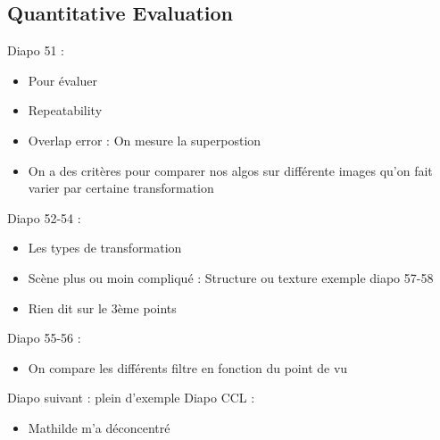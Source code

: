 \documentclass{article}
\theoremstyle{plain}%
\theoremstyle{definition}
\theoremstyle{remark}
\begin{document}
\subsection{Quantitative Evaluation}
Diapo 51 : 
\begin{itemize}
    \item Pour évaluer 
    \item Repeatability 
    \item Overlap error : On mesure la superpostion 
    \item On a des critères pour comparer nos algos sur différente images qu'on fait varier par certaine transformation
\end{itemize}
Diapo 52-54 : 
\begin{itemize}
    \item Les types de transformation 
    \item Scène plus ou moin compliqué : Structure ou texture exemple diapo 57-58
    \item Rien dit sur le 3ème points
\end{itemize}
Diapo 55-56 :
\begin{itemize}
    \item On compare les différents filtre en fonction du point de vu
\end{itemize}
Diapo suivant : plein d'exemple 
Diapo CCL : 
\begin{itemize}
    \item Mathilde m'a déconcentré 
\end{itemize}
\end{document}
